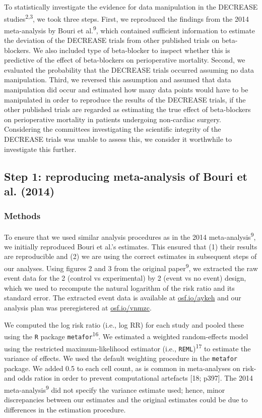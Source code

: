 \documentclass[]{article}
\begin{document}
To statistically investigate the evidence for data manipulation in the
DECREASE studies\textsuperscript{2,3}, we took three steps. First, we
reproduced the findings from the 2014 meta-analysis by Bouri et
al.\textsuperscript{9}, which contained sufficient information to
estimate the deviation of the DECREASE trials from other published
trials on beta-blockers. We also included type of beta-blocker to
inspect whether this is predictive of the effect of beta-blockers on
perioperative mortality. Second, we evaluated the probability that the
DECREASE trials occurred assuming no data manipulation. Third, we
reversed this assumption and assumed that data manipulation did occur
and estimated how many data points would have to be manipulated in order
to reproduce the results of the DECREASE trials, if the other published
trials are regarded as estimating the true effect of beta-blockers on
perioperative mortality in patients undergoing non-cardiac surgery.
Considering the committees investigating the scientific integrity of the
DECREASE trials was unable to assess this, we consider it worthwhile to
investigate this further.

\subsection{Step 1: reproducing meta-analysis of Bouri et al.
(2014)}\label{step-1-reproducing-meta-analysis-of-bouri-et-al.-2014}

\subsubsection{Methods}\label{methods}

To ensure that we used similar analysis procedures as in the 2014
meta-analysis\textsuperscript{9}, we initially reproduced Bouri et al.'s
estimates. This ensured that (1) their results are reproducible and (2)
we are using the correct estimates in subsequent steps of our analyses.
Using figures 2 and 3 from the original paper\textsuperscript{9}, we
extracted the raw event data for the 2 (control vs experimental) by 2
(event vs no event) design, which we used to recompute the natural
logarithm of the risk ratio and its standard error. The extracted event
data is available at \href{https://osf.io/aykeh}{osf.io/aykeh} and our
analysis plan was preregistered at
\href{https://osf.io/vnmzc}{osf.io/vnmzc}.

We computed the log risk ratio (i.e., log RR) for each study and pooled
these using the \texttt{R} package \texttt{metafor}\textsuperscript{16}.
We estimated a weighted random-effects model using the restricted
maximum-likelihood estimator (i.e., \texttt{REML})\textsuperscript{17}
to estimate the variance of effects. We used the default weighting
procedure in the \texttt{metafor} package. We added 0.5 to each cell
count, as is common in meta-analyses on risk- and odds ratios in order
to prevent computational artefacts {[}18; p397{]}. The 2014
meta-analysis\textsuperscript{9} did not specify the variance estimate
used; hence, minor discrepancies between our estimates and the original
estimates could be due to differences in the estimation procedure.
\end{document}
